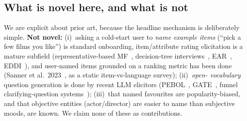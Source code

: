 \documentclass[11pt]{article}
\begin{document}
\subsection{What is novel here, and what is not}
\label{sec:novelty}
We are explicit about prior art, because the headline mechanism is deliberately simple. \textbf{Not novel:} (i)~asking a
cold-start user to \emph{name example items} (``pick a few films you like'') is standard onboarding, item/attribute rating
elicitation is a mature subfield (representative-based MF~\cite{rbmf}, decision-tree interviews~\cite{golbandi11},
EAR~\cite{lei20ear}, EDDI~\cite{eddi}), and user-named items
grounded on a ranking metric has been done (Sanner et al.\ 2023~\cite{sanner23}, as a static item-vs-language survey); (ii)~\emph{open-
vocabulary} question generation is done by recent LLM elicitors (PEBOL~\cite{pebol}, GATE~\cite{gate}, funnel
clarifying-question systems~\cite{montazeralghaem25});
(iii)~that named favourites are popularity-biased, and that objective entities (actor/director) are easier to name than
subjective moods, are known. We claim none of these as contributions.
\end{document}
